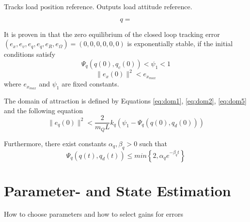 
Tracks load position reference. Outputs load attitude reference.

\begin{equation}\label{eq:con.q}
q =
\end{equation}

\begin{figure}[h!]
	\centering
	\caption{\label{fig:con.loadposloop}}
\end{figure}		

It is proven in \cite{Sreenath2013c} that the zero equilibrium of the closed loop tracking error $ (e_x,e_v,e_q,e_{\dot{q}},e_R,e_\Omega)=(0,0,0,0,0,0) $ is exponentially stable, if the initial conditions satisfy
\begin{equation}\label{eq:dom5}
\Psi_q(q(0),q_c(0))<\psi_1<1
\end{equation}
\begin{equation}
\parallel e_{x}(0)\parallel^2<e_{x_{max}}
\end{equation}
where $ e_{x_{max}} $ and $ \psi_1 $ are fixed constants. 

The domain of attraction is defined by Equations \ref{eq:dom1}, \ref{eq:dom2}, \ref{eq:dom5} and the following equation
\begin{equation}
\parallel e_{\dot{q}}(0)\parallel^2<\frac{2}{m_QL}{k_q}(\psi_1-\Psi_q(q(0),q_d(0)))
\end{equation}


Furthermore, there exist constants $ \alpha_q,\beta_q>0 $ such that
\begin{equation}\label{key}
\Psi_q(q(t),q_d(t)) \leq min\left\lbrace 2,\alpha_qe^{-\beta_qt}\right\rbrace 
\end{equation}

\section{Parameter- and State Estimation}
How to choose parameters and how to select gains for errors\\

